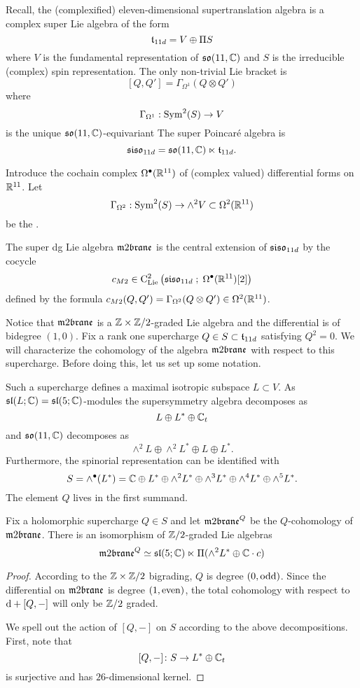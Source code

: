 \documentclass[11pt]{amsart}
\begin{document}
Recall, the (complexified) eleven-dimensional supertranslation algebra is a complex super Lie algebra of the form
\[
  \mathfrak t_{11d} = V \oplus \Pi S
\]
where $V$ is the fundamental representation of $\mathfrak{so}(11 , \mathbb C)$ and $S$ is the irreducible (complex) spin representation.
The only non-trivial Lie bracket is
\[
  [Q, Q'] = \Gamma_{\Omega^1}(Q \otimes Q')
\]
where
\[
  \Gamma_{\Omega^1} : \operatorname{Sym}^2(S) \to V 
\]
is the unique $\mathfrak{so}(11, \mathbb C)$-equivariant 
The super Poincar\'{e} algebra is
\[
  \mathfrak{siso}_{11d} = \mathfrak{so}(11 , \mathbb C) \ltimes \mathfrak t_{11d} .
\]

Introduce the cochain complex $\Omega^{\bullet}(\mathbb R^{11})$ of (complex valued) differential forms on $\mathbb R^{11}$. 
Let
\[
  \Gamma_{\Omega^2} : \operatorname{Sym}^2(S) \to \wedge^2 V \subset \Omega^2(\mathbb R^{11}) 
\]
be the . 

\begin{dfn}
  The super dg Lie algebra $\m2$ is the central extension of $\mathfrak{siso}_{11d}$ by the cocycle
  \[
    c_{M2} \in {\rm C}_{{\rm Lie}}^2\left(\mathfrak{siso}_{11d} \; ; \; \Omega^\bullet (\mathbb R^{11})[2]\right)
  \]
  defined by the formula $c_{M2} (Q, Q') = \Gamma_{\Omega^2}(Q \otimes Q') \in \Omega^2(\mathbb R^{11})$.
\end{dfn}

Notice that $\m2$ is a $\mathbb Z \times \mathbb Z/2$-graded Lie algebra and the differential is of bidegree $(1,0)$.
Fix a rank one supercharge $Q \in S \subset \mathfrak t_{11d}$ satisfying $Q^2 = 0$. 
We will characterize the cohomology of the algebra $\m2$ with respect to this supercharge. 
Before doing this, let us set up some notation. 

Such a supercharge defines a maximal isotropic subspace $L \subset V$. 
As $\mathfrak{sl}(L ; \mathbb C) = \mathfrak{sl}(5 ; \mathbb C)$-modules the supersymmetry algebra decomposes as
\[
L \oplus L^* \oplus \mathbb C_t
\]
and $\mathfrak{so}(11, \mathbb C)$ decomposes as
\[
\wedge^2 L \oplus \wedge^2 L^* \oplus L \oplus L^* .
\]
Furthermore, the spinorial representation can be identified with
\[
S = \wedge^\bullet (L^*) = \mathbb C \oplus L^* \oplus \wedge^2 L^* \oplus \wedge^3 L^* \oplus \wedge^4 L^* \oplus \wedge^5 L^* .
\]
The element $Q$ lives in the first summand.

\begin{lem}
Fix a holomorphic supercharge $Q \in S$ and let $\m2^Q$ be the $Q$-cohomology of $\m2$.
There is an isomorphism of $\mathbb Z/2$-graded Lie algebras
  \[
    \m2^Q \simeq \fsl(5;\CC) \ltimes \Pi (\wedge^2 L^* \oplus \CC\cdot c)
  \]
\end{lem}
\begin{proof}
According to the $\mathbb Z \times \mathbb Z/2$ bigrading, $Q$ is degree $(0,{\rm odd})$.
Since the differential on $\m2$ is degree $(1,{\rm even})$, the total cohomology with respect to ${\rm d} + [Q,-]$ will only be $\mathbb Z/2$ graded. 
 
We spell out the action of $[Q,-]$ on $S$ according to the above decompositions.
First, note that
\[
[Q,-] \colon S \to L^* \oplus \mathbb C_t
\]
is surjective and has $26$-dimensional kernel. 
\end{proof}
\end{document}
